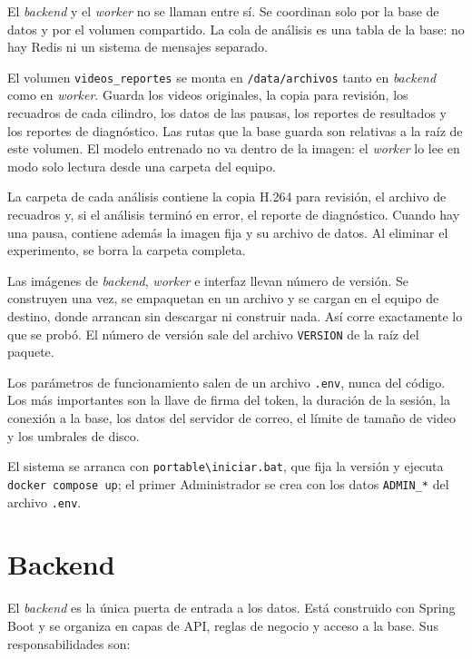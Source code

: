 El \textit{backend} y el \textit{worker} no se llaman entre sí. Se coordinan solo por la base de datos
y por el volumen compartido. La cola de análisis es una tabla de la base: no hay Redis ni un sistema
de mensajes separado.

El volumen \texttt{videos\_reportes} se monta en \texttt{/data/archivos} tanto en \textit{backend} como
en \textit{worker}. Guarda los videos originales, la copia para revisión, los recuadros de cada cilindro,
los datos de las pausas, los reportes de resultados y los reportes de diagnóstico. Las rutas que la
base guarda son relativas a la raíz de este volumen. El modelo entrenado no va dentro de la imagen: el
\textit{worker} lo lee en modo solo lectura desde una carpeta del equipo.

La carpeta de cada análisis contiene la copia H.264 para revisión, el archivo de recuadros y, si el
análisis terminó en error, el reporte de diagnóstico. Cuando hay una pausa, contiene además la imagen
fija y su archivo de datos. Al eliminar el experimento, se borra la carpeta completa.

Las imágenes de \textit{backend}, \textit{worker} e interfaz llevan número de versión. Se construyen una
vez, se empaquetan en un archivo y se cargan en el equipo de destino, donde arrancan sin descargar ni
construir nada. Así corre exactamente lo que se probó. El número de versión sale del archivo
\texttt{VERSION} de la raíz del paquete.

Los parámetros de funcionamiento salen de un archivo \texttt{.env}, nunca del código. Los más
importantes son la llave de firma del token, la duración de la sesión, la conexión a la base, los datos
del servidor de correo, el límite de tamaño de video y los umbrales de disco.

El sistema se arranca con \texttt{portable\textbackslash iniciar.bat}, que fija la versión y ejecuta
\texttt{docker compose up}; el primer Administrador se crea con los datos \texttt{ADMIN\_*} del archivo \texttt{.env}.

\section{Backend}

El \textit{backend} es la única puerta de entrada a los datos. Está construido con Spring Boot y se
organiza en capas de API, reglas de negocio y acceso a la base. Sus responsabilidades son:

